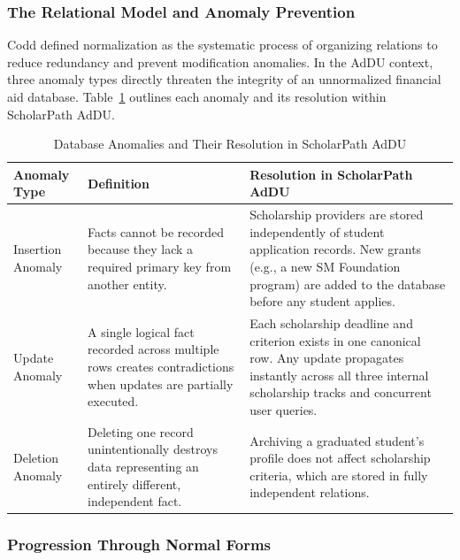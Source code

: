 \subsubsection{The Relational Model and Anomaly Prevention}

Codd \cite{ref17} defined normalization as the systematic process of organizing relations to reduce redundancy and prevent modification anomalies. In the AdDU context, three anomaly types directly threaten the integrity of an unnormalized financial aid database. Table~\ref{tab:anomalies} outlines each anomaly and its resolution within ScholarPath AdDU. \begin{table}[htbp]
  \centering
  \small
  \caption{Database Anomalies and Their Resolution in ScholarPath AdDU}
  \label{tab:anomalies}
  \begin{tabular}{@{}p{2.6cm} p{5.6cm} p{5.6cm}@{}}
    \toprule
    Anomaly Type & Definition & Resolution in ScholarPath AdDU \\
    \midrule
    Insertion Anomaly & Facts cannot be recorded because they lack a required primary key from another entity. & Scholarship providers are stored independently of student application records. New grants (e.g., a new SM Foundation program) are added to the database before any student applies. \\
    \addlinespace
    Update Anomaly & A single logical fact recorded across multiple rows creates contradictions when updates are partially executed. & Each scholarship deadline and criterion exists in one canonical row. Any update propagates instantly across all three internal scholarship tracks and concurrent user queries. \\
    \addlinespace
    Deletion Anomaly & Deleting one record unintentionally destroys data representing an entirely different, independent fact. & Archiving a graduated student's profile does not affect scholarship criteria, which are stored in fully independent relations. \\
    \bottomrule
  \end{tabular}
\end{table}


\subsubsection{Progression Through Normal Forms}

